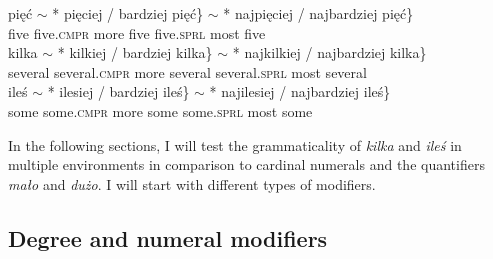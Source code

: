 \documentclass[output=paper,
]{langscibook}
\begin{document}
	\ea \label{ex:comparison-cardinals} \ea \gll pięć $\sim$ *\hspace{-2pt} \minsp{\{} pięciej / bardziej pięć\} $\sim$ *\hspace{-2pt} \minsp{\{} najpięciej / najbardziej {pięć\}}\\
	five {} {} {} five.\textsc{cmpr} {} more five {} {} {} five.\textsc{sprl} {} most five\\
	\ex \gll kilka $\sim$ *\hspace{-2pt} \minsp{\{} kilkiej / bardziej {kilka\}} $\sim$ *\hspace{-2pt} \minsp{\{} najkilkiej / najbardziej {kilka\}}\\
	several {} {} {} several.\textsc{cmpr} {} more several {} {} {} several.\textsc{sprl} {} most several\\
	\ex \gll ileś $\sim$ *\hspace{-2pt} \minsp{\{} ilesiej / bardziej {ileś\}} $\sim$ *\hspace{-2pt} \minsp{\{} najilesiej / najbardziej {ileś\}}\\
	some {} {} {} some.\textsc{cmpr} {} more some {} {} {} some.\textsc{sprl} {} most some\\
	\z
    \z
    
	\noindent In the following sections, I will test the grammaticality of \textit{kilka} and \textit{ileś} in multiple environments in comparison to cardinal numerals and the quantifiers \textit{mało} and \textit{dużo}. I will start with different types of modifiers.
	
	\subsection{Degree and numeral modifiers}\label{sec:degree-and-numeral-modifiers}
	
\end{document}
